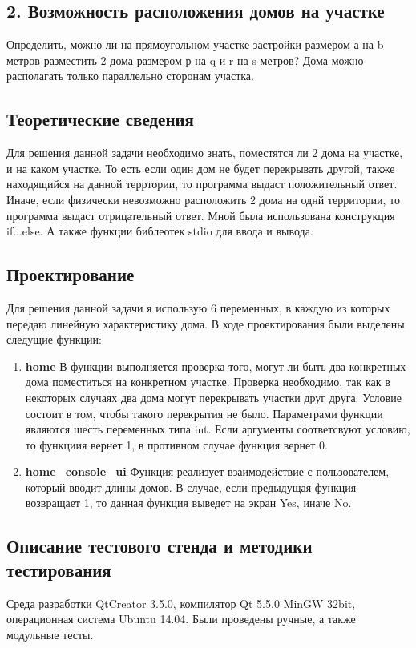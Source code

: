 \documentclass[12pt,a4paper]{report}
\begin{document}
\subsection{2. Возможность расположения домов на участке}
\hspace{\parindent}
Определить, можно ли на прямоугольном участке застройки размером а на b метров разместить 2 дома размером р на q и r на s метров? Дома можно располагать только параллельно сторонам участка.

\subsection{Теоретические сведения}
\hspace{\parindent}
Для решения данной задачи необходимо знать, поместятся ли 2 дома на участке, и на каком участке. То есть если один дом не будет перекрывать другой, также находящийся на данной терртории, то программа выдаст положительный ответ. Иначе, если физически невозможно расположить 2 дома на однй территории, то программа выдаст отрицательный ответ. Мной была использована конструкция if...else. А также  функции библеотек stdio для ввода и вывода.

\subsection{Проектирование}
\hspace{\parindent}
Для решения данной задачи я использую 6 переменных, в каждую из которых передаю линейную характеристику дома.
	В ходе проектирования были выделены следущие функции:
\begin{enumerate}
	\item \textbf{home}
	В  функции выполняется проверка того, могут ли быть два конкретных дома поместиться на конкретном  участке. Проверка необходимо, так как в некоторых случаях два дома могут перекрывать участки друг друга. Условие состоит в том, чтобы такого перекрытия не было.
	Параметрами функции являются шесть переменных типа int. Если аргументы соответсвуют условию, то функциия вернет 1, в противном случае функция вернет 0.
		\item \textbf{home\_console\_ui}
	Функция реализует взаимодействие с пользователем, который вводит длины домов. В случае, если предыдущая функция возвращает 1, то данная функция выведет на экран Yes, иначе No.
\end{enumerate}

\subsection{Описание тестового стенда и методики тестирования}
\hspace{\parindent}
Среда разработки QtCreator 3.5.0, компилятор Qt 5.5.0 MinGW 32bit, операционная система Ubuntu 14.04. Были проведены ручные, а также модульные тесты.
\end{document}
